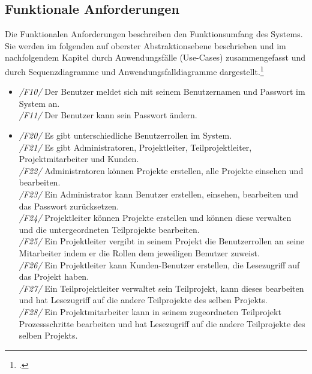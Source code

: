 \subsection{Funktionale Anforderungen}
Die Funktionalen Anforderungen beschreiben den Funktionsumfang des Systems. Sie werden im folgenden auf oberster Abstraktionsebene beschrieben und im nachfolgendem Kapitel durch Anwendungsfälle (Use-Cases) zusammengefasst und durch Sequenzdiagramme und Anwendungsfalldiagramme dargestellt.\footcite[Vgl.][S. 496]{balzert}

\begin{itemize}
    
    \item[]\emph{/F10/} Der Benutzer meldet sich mit seinem Benutzernamen und Passwort im System an.
    \\\emph{/F11/} Der Benutzer kann sein Passwort ändern.  
    \vspace{0.5cm}   
    
    \item[] \emph{/F20/} Es gibt unterschiedliche Benutzerrollen im System.
    \\\emph{/F21/} Es gibt Administratoren, Projektleiter, Teilprojektleiter, Projektmitarbeiter und Kunden.
    \\\emph{/F22/} Administratoren können Projekte erstellen, alle Projekte einsehen und bearbeiten.
    \\\emph{/F23/} Ein Administrator kann Benutzer erstellen, einsehen, bearbeiten und das Passwort zurücksetzen.
    \\\emph{/F24/} Projektleiter können Projekte erstellen und können diese verwalten und die untergeordneten Teilprojekte bearbeiten.
    \\\emph{/F25/} Ein Projektleiter vergibt in seinem Projekt die Benutzerrollen an seine Mitarbeiter indem er die Rollen dem jeweiligen Benutzer zuweist.
    \\\emph{/F26/} Ein Projektleiter kann Kunden-Benutzer erstellen, die Lesezugriff auf das Projekt haben.
    \\\emph{/F27/} Ein Teilprojektleiter verwaltet sein Teilprojekt, kann dieses bearbeiten und hat Lesezugriff auf die andere Teilprojekte des selben Projekts.
    \\\emph{/F28/} Ein Projektmitarbeiter kann in seinem zugeordneten Teilprojekt Prozessschritte bearbeiten und hat Lesezugriff auf die andere Teilprojekte des selben Projekts.
    \vspace{0.5cm}
    

\end{itemize}
